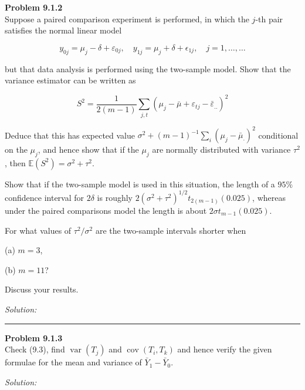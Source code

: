 \documentclass[a4paper, 11pt]{article}
\newenvironment{problem}[2][Problem]
    { \begin{mdframed}[backgroundcolor=gray!20] \textbf{#1 #2} \\}
    {  \end{mdframed}}
\newenvironment{solution}
    {\textit{Solution:}}
    {}
\begin{document}
\begin{problem}{9.1.2}

Suppose a paired comparison experiment is performed, in which the $j$-th pair satisfies the normal linear model

$$y_{0j}=\mu_{j}-\delta+\varepsilon_{0 j}, \quad y_{1 j}=\mu_{j}+\delta+\epsilon_{1 j}, \quad j=1, \ldots, \ldots$$

but that data analysis is performed using the two-sample model. Show that the variance estimator can be written as

$$S^{2}=\frac{1}{2(m-1)} \sum_{j, t}\left(\mu_{j}-\bar{\mu}+\varepsilon_{t j}-\bar{\varepsilon}_{..}\right)^{2}$$

Deduce that this has expected value $\sigma^{2}+(m-1)^{-1} \sum_{i}\left(\mu_{j}-\bar{\mu}_{\cdot}\right)^{2}$ conditional on the $\mu_j$, and hence show that if the $\mu_j$ are normally distributed with variance $\tau^2$, then $\mathbb{E}(S^2) =\sigma^{2}+\tau^{2}$.

Show that if the two-sample model is used in this situation, the length of a $95\%$ confidence interval for $2\delta$ is roughly $2\left(\sigma^{2}+\tau^{2}\right)^{1 / 2} t_{2(m-1)}(0.025)$, whereas under the paired comparisons model the length is about $2 \sigma t_{m-1}(0.025)$. 

For what values of $\tau^{2} / \sigma^{2}$ are the two-sample intervals shorter when 

(a) $m = 3$, 

(b) $m = 11$? 

Discuss your results.
\end{problem}
\begin{solution}
\end{solution} 

\noindent\rule{7in}{2.8pt}

\begin{problem}{9.1.3}
	Check (9.3), find $\operatorname{var}\left(T_{j}\right)$ and $\operatorname{cov}\left(T_{i}, T_{k}\right)$ and hence verify the given formulae for the mean and variance of $\bar{Y}_{1}-\bar{Y}_{0}$.
\end{problem}
\begin{solution}
\end{solution} 
\end{document}
